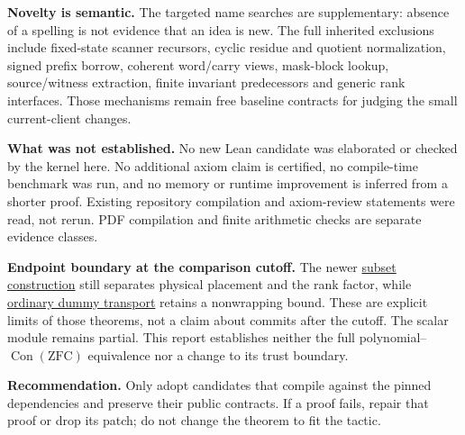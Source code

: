 \textbf{Novelty is semantic.} The targeted name searches are supplementary: absence of a spelling is not evidence that an idea is new. The full inherited exclusions include fixed-state scanner recursors, cyclic residue and quotient normalization, signed prefix borrow, coherent word/carry views, mask-block lookup, source/witness extraction, finite invariant predecessors and generic rank interfaces. Those mechanisms remain free baseline contracts for judging the small current-client changes.

\textbf{What was not established.} No new Lean candidate was elaborated or checked by the kernel here. No additional axiom claim is certified, no compile-time benchmark was run, and no memory or runtime improvement is inferred from a shorter proof. Existing repository compilation and axiom-review statements were read, not rerun. PDF compilation and finite arithmetic checks are separate evidence classes.

\textbf{Endpoint boundary at the comparison cutoff.} The newer \href{https://github.com/VladimirReshetnikov/ProveIt/blob/91dce223cda86c0755b8a9b2504f84be04443fce/Computability/DiophantineConsistency/Lean/DiophantineConsistency/CurrentControllerSubsets2011.lean\#L4-L10}{subset construction} still separates physical placement and the rank factor, while \href{https://github.com/VladimirReshetnikov/ProveIt/blob/91dce223cda86c0755b8a9b2504f84be04443fce/Computability/DiophantineConsistency/Lean/DiophantineConsistency/CurrentDummyMutation2011.lean\#L5-L10}{ordinary dummy transport} retains a nonwrapping bound. These are explicit limits of those theorems, not a claim about commits after the cutoff. The scalar module remains partial. This report establishes neither the full polynomial--$\operatorname{Con}(\mathrm{ZFC})$ equivalence nor a change to its trust boundary.

\textbf{Recommendation.} Only adopt candidates that compile against the pinned dependencies and preserve their public contracts. If a proof fails, repair that proof or drop its patch; do not change the theorem to fit the tactic.
